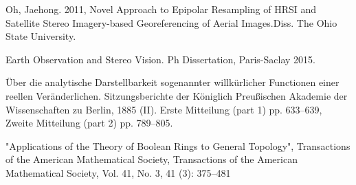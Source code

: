 \documentclass[a4paper]{article}
\begin{document}
\begin{thebibliography}{References}
            Oh,     Jaehong. 2011,     Novel     Approach     to     Epipolar Resampling  of  
            HRSI  and  Satellite  Stereo  Imagery-based Georeferencing   of   Aerial   Images.Diss.
            The   Ohio   State University.

      Earth Observation and Stereo Vision.
           Ph Dissertation, Paris-Saclay 2015.

     Über die analytische Darstellbarkeit sogenannter willkürlicher Functionen 
           einer reellen Veränderlichen. Sitzungsberichte der Königlich Preußischen Akademie der Wissenschaften zu Berlin, 
           1885 (II).  Erste Mitteilung (part 1) pp. 633–639, Zweite Mitteilung (part 2) pp. 789–805.

     "Applications of the Theory of Boolean Rings to General Topology", 
          Transactions of the American Mathematical Society, Transactions of the American Mathematical Society, 
          Vol. 41, No. 3, 41 (3): 375–481
\end{thebibliography}
\end{document}
